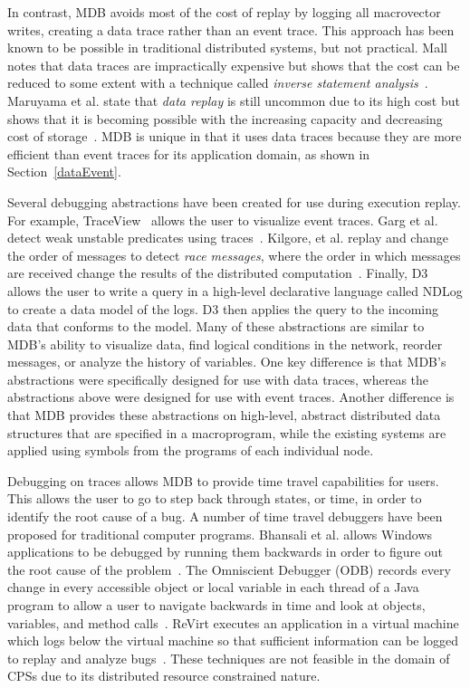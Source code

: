 In contrast, MDB avoids most of the cost of replay by logging all macrovector
writes, creating a data trace rather than an event trace.  This approach has
been known to be possible in traditional distributed systems, but not practical.
Mall notes that data traces are impractically expensive but shows that the cost
can be reduced to some extent with a technique called \emph{inverse statement
analysis}~\cite{Mall1999}. Maruyama et al. state that \emph{data replay} is
still uncommon due to its high cost but shows that it is becoming possible with
the increasing capacity and decreasing cost of storage~\cite{Maruyama2005}. MDB
is unique in that it uses data traces because they are more efficient than event
traces for its application domain, as shown in Section~\ref{dataEvent}.

Several debugging abstractions have been created for use during execution
replay. For example, TraceView~\cite{Malony1991} allows the user to visualize
event traces. Garg et al. detect weak unstable predicates using
traces~\cite{Garg1994}.  Kilgore, et al. replay and change the order of messages
to detect \emph{race messages}, where the order in which messages are received
change the results of the distributed computation~\cite{Kilgore1997}.  Finally,
D3~\cite{Chun2008} allows the user to write a query in a high-level declarative
language called NDLog to create a data model of the logs. D3 then applies the
query to the incoming data that conforms to the model.  Many of these
abstractions are similar to MDB's ability to visualize data, find logical
conditions in the network, reorder messages, or analyze the history of
variables.  One key difference is that MDB's abstractions were specifically
designed for use with data traces, whereas the abstractions above were designed
for use with event traces.  Another difference is that MDB provides these
abstractions on high-level, abstract distributed data structures that are
specified in a macroprogram, while the existing systems are applied using
symbols from the programs of each individual node.

Debugging on traces allows MDB to provide time travel capabilities for
users. This allows the user to go to step back through states, or time, in order
to identify the root cause of a bug. A number of time travel debuggers have been
proposed for traditional computer programs. Bhansali et al. allows Windows
applications to be debugged by running them backwards in order to figure out the
root cause of the problem~\cite{Bhansali2006}. The Omniscient Debugger (ODB)
records every change in every accessible object or local variable in each thread
of a Java program to allow a user to navigate backwards in time and look at
objects, variables, and method calls~\cite{Lewis2003}. ReVirt executes an
application in a virtual machine which logs below the virtual machine so that
sufficient information can be logged to replay and analyze
bugs~\cite{Dunlap2002}. These techniques are not feasible in the domain of CPSs
due to its distributed resource constrained nature.

